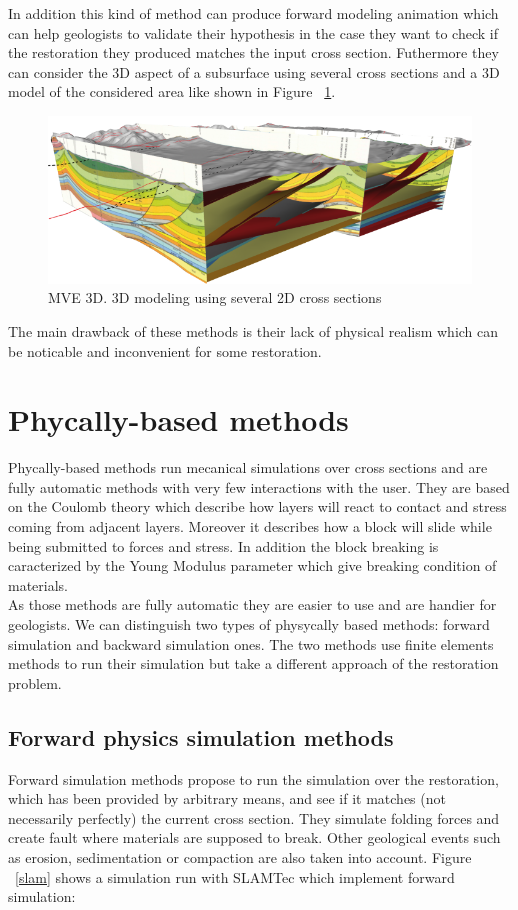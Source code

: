 \documentclass[12pt, a4paper]{report} %
\begin{document}
In addition this kind of method can produce forward modeling animation which can help geologists to validate their hypothesis in the case they want to check if the restoration they produced matches the input cross section. Futhermore they can consider the 3D aspect of a subsurface using several cross sections and a 3D model of the considered area like shown in Figure ~\ref{mve3}.

\begin{figure}[H]
	\centering
	\includegraphics[scale=1]{mve3D.png}
	\caption{MVE 3D. 3D modeling using several 2D cross sections}
	\label{mve3}
\end{figure}


The main drawback of these methods is their lack of physical realism which can be noticable and inconvenient for some restoration.
\section{Phycally-based methods}
Phycally-based methods run mecanical simulations over cross sections and are fully automatic methods with very few interactions with the user. They are based on the Coulomb theory which describe how layers will react to contact and stress coming from  adjacent layers. Moreover it describes how a block will slide while being submitted to forces and stress. In addition the block breaking is caracterized by the Young Modulus parameter which give breaking condition of materials. \\
As those methods are fully automatic they are easier to use and are handier for geologists.
We can distinguish two types of physycally based methods: forward simulation and backward simulation ones.
The two methods use finite elements methods to run their simulation but take a different approach of the restoration problem.
\subsection{Forward physics simulation methods}
Forward simulation methods propose to run the simulation over the restoration, which has been provided by arbitrary means, and see if it matches (not necessarily perfectly) the current cross section. They simulate folding forces and create fault where materials are supposed to break. Other geological events such as erosion, sedimentation or compaction are also taken into account. Figure ~\ref{slam} shows a simulation run with SLAMTec \cite{SLAMTec} which implement forward simulation:
\end{document}
